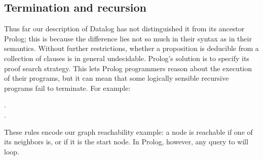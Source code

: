 

\subsection{Termination and recursion}

Thus far our description of Datalog has not distinguished it from its ancestor
Prolog; this is because the difference lies not so much in their syntax as in
their semantics.
%
Without further restrictions, whether a proposition is deducible from a
collection of clauses is in general undecidable.
%
Prolog's solution is to specify its proof search strategy.
%
This lets Prolog programmers reason about the execution of their programs, but
it can mean that some logically sensible recursive programs fail to terminate.
%
For example:

\nopagebreak[2]
\label{datalog-reachable}
\begin{datalog}
   \gets {} \conj {}.\\
  .
\end{datalog}


\noindent
These rules encode our graph reachability example: a node is reachable if one of its neighbors is, or if it is the start node.
%
%
In Prolog, however, any query to  will loop.

